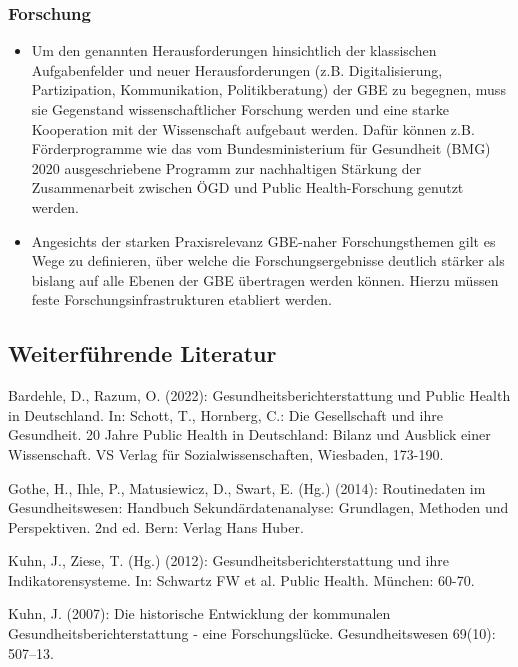 \documentclass{article}
\begin{document}
\subsubsection{Forschung}\label{H8703837}


\begin{itemize}
\item Um den genannten Herausforderungen hinsichtlich der klassischen Aufgabenfelder und neuer Herausforderungen (z.B. Digitalisierung, Partizipation, Kommunikation, Politikberatung) der GBE zu begegnen, muss sie Gegenstand wissenschaftlicher Forschung werden und eine starke Kooperation mit der Wissenschaft aufgebaut werden. Dafür können z.B. Förderprogramme wie das vom Bundesministerium für Gesundheit (BMG) 2020 ausgeschriebene Programm zur nachhaltigen Stärkung der Zusammenarbeit zwischen ÖGD und Public Health-Forschung genutzt werden.


\item Angesichts der starken Praxisrelevanz GBE-naher Forschungsthemen gilt es Wege zu definieren, über welche die Forschungsergebnisse deutlich stärker als bislang auf alle Ebenen der GBE übertragen werden können. Hierzu müssen feste Forschungsinfrastrukturen etabliert werden.


\end{itemize}

\subsection{Weiterführende Literatur}\label{H1868855}



Bardehle, D., Razum, O. (2022): Gesundheitsberichterstattung und Public Health in Deutschland. In: Schott, T., Hornberg, C.: Die Gesellschaft und ihre Gesundheit. 20 Jahre Public Health in Deutschland: Bilanz und Ausblick einer Wissenschaft. VS Verlag für Sozialwissenschaften, Wiesbaden, 173-190.


Gothe, H., Ihle, P., Matusiewicz, D., Swart, E. (Hg.) (2014): Routinedaten im Gesundheitswesen: Handbuch Sekundärdatenanalyse: Grundlagen, Methoden und Perspektiven. 2nd ed. Bern: Verlag Hans Huber.


Kuhn, J., Ziese, T. (Hg.) (2012): Gesundheitsberichterstattung und ihre Indikatorensysteme. In: Schwartz FW et al. Public Health. München: 60-70.


Kuhn, J. (2007): Die historische Entwicklung der kommunalen Gesundheitsberichterstattung - eine Forschungslücke. Gesundheitswesen 69(10): 507–13.
\end{document}
